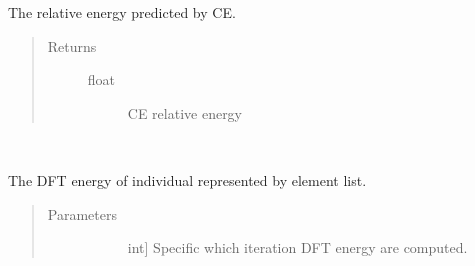 \documentclass[letterpaper,10pt,english]{sphinxmanual}
\begin{document}
\begin{fulllineitems}
\begin{fulllineitems}
\begin{quote}
\begin{description}
\begin{description}
\end{description}

\end{description}\end{quote}

\end{fulllineitems}


\begin{fulllineitems}
\label{\detokenize{pygace:pygace.utility.EleIndv.ce_energy_ref}}
\sphinxAtStartPar
The relative energy predicted by CE.
\begin{quote}\begin{description}
\item[{Returns}] \leavevmode\begin{description}
\item[{float}] \leavevmode
\sphinxAtStartPar
CE relative energy

\end{description}

\end{description}\end{quote}

\end{fulllineitems}


\begin{fulllineitems}
\label{\detokenize{pygace:pygace.utility.EleIndv.ce_object}}~
\end{fulllineitems}


\begin{fulllineitems}
\label{\detokenize{pygace:pygace.utility.EleIndv.dft_energy}}
\sphinxAtStartPar
The DFT energy of individual represented by element list.
\begin{quote}\begin{description}
\item[{Parameters}] \leavevmode\begin{description}
\item[{}] \leavevmode{[}int{]}
\sphinxAtStartPar
Specific which iteration DFT energy are computed.


\end{description}
\end{description}
\end{quote}
\end{fulllineitems}
\end{fulllineitems}
\end{document}
